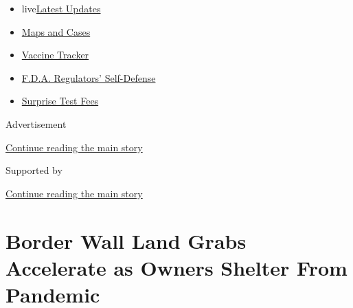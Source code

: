 \begin{itemize}
\tightlist
\item
  live\href{https://www.nytimes3xbfgragh.onion/2020/09/11/world/covid-19-coronavirus.html?name=styln-coronavirus-national\&region=TOP_BANNER\&block=storyline_menu_recirc\&action=click\&pgtype=Article\&impression_id=79168eb1-f4b9-11ea-b51e-55332169c079\&variant=undefined}{Latest
  Updates}
\item
  \href{https://www.nytimes3xbfgragh.onion/interactive/2020/us/coronavirus-us-cases.html?name=styln-coronavirus-national\&region=TOP_BANNER\&block=storyline_menu_recirc\&action=click\&pgtype=Article\&impression_id=79168eb2-f4b9-11ea-b51e-55332169c079\&variant=undefined}{Maps
  and Cases}
\item
  \href{https://www.nytimes3xbfgragh.onion/interactive/2020/science/coronavirus-vaccine-tracker.html?name=styln-coronavirus-national\&region=TOP_BANNER\&block=storyline_menu_recirc\&action=click\&pgtype=Article\&impression_id=7916b5c0-f4b9-11ea-b51e-55332169c079\&variant=undefined}{Vaccine
  Tracker}
\item
  \href{https://www.nytimes3xbfgragh.onion/2020/09/10/us/politics/fda-coronavirus-vaccine.html?name=styln-coronavirus-national\&region=TOP_BANNER\&block=storyline_menu_recirc\&action=click\&pgtype=Article\&impression_id=7916b5c1-f4b9-11ea-b51e-55332169c079\&variant=undefined}{F.D.A.
  Regulators' Self-Defense}
\item
  \href{https://www.nytimes3xbfgragh.onion/2020/09/09/upshot/coronavirus-surprise-test-fees.html?name=styln-coronavirus-national\&region=TOP_BANNER\&block=storyline_menu_recirc\&action=click\&pgtype=Article\&impression_id=7916b5c2-f4b9-11ea-b51e-55332169c079\&variant=undefined}{Surprise
  Test Fees}
\end{itemize}

Advertisement

\protect\hyperlink{after-top}{Continue reading the main story}

Supported by

\protect\hyperlink{after-sponsor}{Continue reading the main story}

\hypertarget{border-wall-land-grabs-accelerate-as-owners-shelter-from-pandemic}{%
\section{Border Wall Land Grabs Accelerate as Owners Shelter From
Pandemic}\label{border-wall-land-grabs-accelerate-as-owners-shelter-from-pandemic}}

